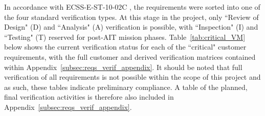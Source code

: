 \documentclass[a4paper, 11pt, conference]{IEEEtran}
\begin{document}
In accordance with ECSS-E-ST-10-02C \cite{noauthor_ecss-e-st-10-02c_2018}, the requirements were sorted into one of the four standard  verification types. At this stage in the project, only ``Review of Design" (D) and ``Analysis" (A) verification is possible, with ``Inspection" (I) and ``Testing" (T) reserved for post-AIT mission phases. Table~\ref{tab:critical_VM} below shows the current verification status for each of the ``critical" customer requirements, with the full customer and derived verification matrices contained within Appendix~\ref{subsec:reqs_verif_appendix}. It should be noted that full verification of all requirements is not possible within the scope of this project and as such, these tables indicate preliminary compliance. A table of the planned, final verification activities is therefore also included in Appendix~\ref{subsec:reqs_verif_appendix}.
\end{document}

